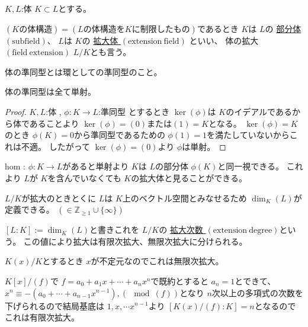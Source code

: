 \documentclass[../master_galois_theory]{subfiles}
\begin{document}
\begin{defi}
  $K , L$:体 $K \subset L$とする。

  $(Kの体構造) = (Lの体構造をKに制限したもの)$であるとき
  $K$は $L$の \underline{部分体 $(\mathrm{subfield})$}、
  $L$は $K$の \underline{拡大体 $(\mathrm{extension \  field})$}
  といい、
  体の拡大 $(\mathrm{field \  extension})$ $L/K$とも言う。

\end{defi}

\begin{defi}
  体の準同型とは環としての準同型のこと。
\end{defi}

\begin{note} \label{note:fieldtansya}
  体の準同型は全て単射。
\end{note}
\begin{proof}
  $K , L$:体 , $\phi : K \longrightarrow L$:準同型
  とするとき $\ker (\phi)$は $K$のイデアルであるから体であることより
  $\ker (\phi) = (0) または (1) = K$となる。
  $\ker (\phi) = K$のとき $\phi(K) = 0$から準同型であるための $\phi(1) = 1$を満たしていないからこれは不適。
  したがって $\ker (\phi) = (0)$より $\phi$は単射。
\end{proof}

  hom : $\phi : K \longrightarrow L$があると単射より $K$は $L$の部分体 $\phi(K)$と同一視できる。
  これより $L$が $K$を含んでいなくても $K$の拡大体と見ることができる。

  $L/K$が拡大のときとくに $L$は $K$上のベクトル空間とみなせるため $\dim_K(L)$が定義できる。 $(\in \mathbb{Z}_{\geq 1} \cup \{ \infty \})$

  \begin{defi}
    $[L:K] := \dim_K(L)$と書きこれを $L/K$の \underline{拡大次数 $(\mathrm{extension \  degree})$}という。
    この値により拡大は有限次拡大、無限次拡大に分けられる。
  \end{defi}

  \begin{exam}
    $K(x)/K$とするとき $x$が不定元なのでこれは無限次拡大。

    $K[x]/(f)$で $f = a_0 + a_1 x + \cdots + a_n x^n$で既約とすると
    $a_n = 1$とできて、 $x^n \equiv -(a_0 + \cdots + a_{n-1} x^{n-1}) , (\mod (f))$となり
    $n$次以上の多項式の次数を下げられるので結局基底は $1 , x , \cdots x^{n-1}$より $[K(x)/(f) : K] = n$となるのでこれは有限次拡大。
  \end{exam}
\end{document}
